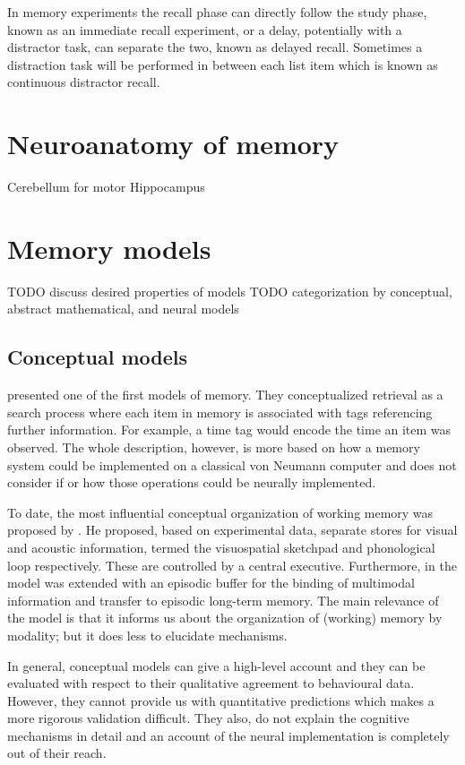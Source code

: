 In memory experiments the recall phase can directly follow the study phase, known as an immediate recall experiment, or a delay, potentially with a distractor task, can separate the two, known as delayed recall.
Sometimes a distraction task will be performed in between each list item which is known as continuous distractor recall.


\section{Neuroanatomy of memory}
Cerebellum for motor
Hippocampus


\section{Memory models}
TODO discuss desired properties of models
TODO categorization by conceptual, abstract mathematical, and neural models

\subsection{Conceptual models}
\Textcite{Yntema1963} presented one of the first models of memory.
They conceptualized retrieval as a search process where each item in memory is associated with tags referencing further information.
For example, a time tag would encode the time an item was observed.
The whole description, however, is more based on how a memory system could be implemented on a classical von Neumann computer and does not consider if or how those operations could be neurally implemented.

To date, the most influential conceptual organization of working memory was proposed by \textcite{Baddeley1986}.
He proposed, based on experimental data, separate stores for visual and acoustic information, termed the visuospatial sketchpad and phonological loop respectively.
These are controlled by a central executive.
Furthermore, in \textcite{Baddeley2000} the model was extended with an episodic buffer for the binding of multimodal information and transfer to episodic long-term memory.
The main relevance of the model is that it informs us about the organization of (working) memory by modality; but it does less to elucidate mechanisms.

In general, conceptual models can give a high-level account and they can be evaluated with respect to their qualitative agreement to behavioural data.
However, they cannot provide us with quantitative predictions which makes a more rigorous validation difficult.
They also, do not explain the cognitive mechanisms in detail and an account of the neural implementation is completely out of their reach.


